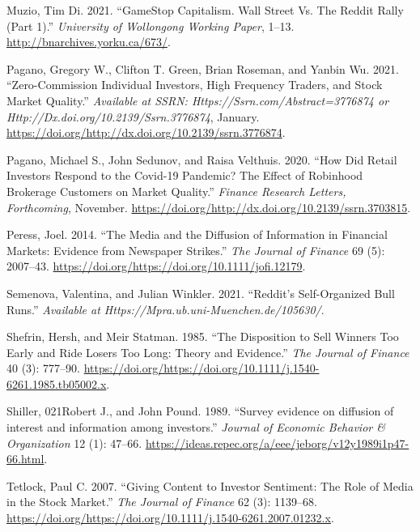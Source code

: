 \documentclass[12pt,]{article}
\begin{document}
\leavevmode\hypertarget{ref-dimuzio2021}{}%
Muzio, Tim Di. 2021. ``GameStop Capitalism. Wall Street Vs. The Reddit
Rally (Part 1).'' \emph{University of Wollongong Working Paper}, 1--13.
\url{http://bnarchives.yorku.ca/673/}.

\leavevmode\hypertarget{ref-eaton2021}{}%
Pagano, Gregory W., Clifton T. Green, Brian Roseman, and Yanbin Wu.
2021. ``Zero-Commission Individual Investors, High Frequency Traders,
and Stock Market Quality.'' \emph{Available at SSRN:
Https://Ssrn.com/Abstract=3776874 or
Http://Dx.doi.org/10.2139/Ssrn.3776874}, January.
\url{https://doi.org/http://dx.doi.org/10.2139/ssrn.3776874}.

\leavevmode\hypertarget{ref-pagano2020}{}%
Pagano, Michael S., John Sedunov, and Raisa Velthuis. 2020. ``How Did
Retail Investors Respond to the Covid-19 Pandemic? The Effect of
Robinhood Brokerage Customers on Market Quality.'' \emph{Finance
Research Letters, Forthcoming}, November.
\href{https://doi.org/http://dx.doi.org/10.2139/ssrn.3703815\%20}{https://doi.org/http://dx.doi.org/10.2139/ssrn.3703815}.

\leavevmode\hypertarget{ref-peress2014}{}%
Peress, Joel. 2014. ``The Media and the Diffusion of Information in
Financial Markets: Evidence from Newspaper Strikes.'' \emph{The Journal
of Finance} 69 (5): 2007--43.
\url{https://doi.org/https://doi.org/10.1111/jofi.12179}.

\leavevmode\hypertarget{ref-semenova2021}{}%
Semenova, Valentina, and Julian Winkler. 2021. ``Reddit's Self-Organized
Bull Runs.'' \emph{Available at
Https://Mpra.ub.uni-Muenchen.de/105630/}.

\leavevmode\hypertarget{ref-shefrin1985}{}%
Shefrin, Hersh, and Meir Statman. 1985. ``The Disposition to Sell
Winners Too Early and Ride Losers Too Long: Theory and Evidence.''
\emph{The Journal of Finance} 40 (3): 777--90.
\url{https://doi.org/https://doi.org/10.1111/j.1540-6261.1985.tb05002.x}.

\leavevmode\hypertarget{ref-shiller1989}{}%
Shiller, 021Robert J., and John Pound. 1989. ``Survey evidence on
diffusion of interest and information among investors.'' \emph{Journal
of Economic Behavior \& Organization} 12 (1): 47--66.
\url{https://ideas.repec.org/a/eee/jeborg/v12y1989i1p47-66.html}.

\leavevmode\hypertarget{ref-tetlock2007}{}%
Tetlock, Paul C. 2007. ``Giving Content to Investor Sentiment: The Role
of Media in the Stock Market.'' \emph{The Journal of Finance} 62 (3):
1139--68.
\url{https://doi.org/https://doi.org/10.1111/j.1540-6261.2007.01232.x}.
\end{document}

